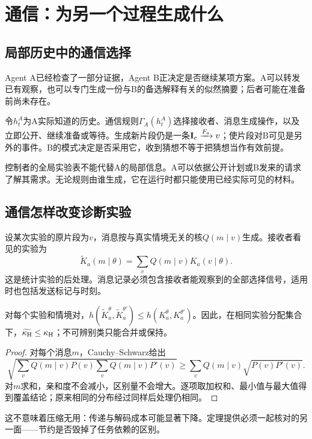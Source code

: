 \chapter{通信：为另一个过程生成什么}
\label{ch:communication}

\section{局部历史中的通信选择}
Agent A已经检查了一部分证据，Agent B正决定是否继续某项方案。A可以转发已有观察，也可以专门生成一份与B的备选解释有关的似然摘要；后者可能在准备前尚未存在。

令$h_t^A$为A实际知道的历史。通信规则$\Gamma_A(h_t^A)$选择接收者、消息生成操作，以及立即公开、继续准备或等待。生成新片段仍是一条$\mathbf I_e\xrightarrow{F_a}v$；使片段对B可见是另外的事件。B的模式决定是否采用它，收到猜想不等于把猜想当作有效前提。

控制者的全局实验表不能代替A的局部信息。A可以依据公开计划或B发来的请求了解其需求。无论规则由谁生成，它在运行时都只能使用已经实际可见的材料。

\section{通信怎样改变诊断实验}
设某次实验的原片段为$v$，消息按与真实情境无关的核$Q(m\mid v)$生成。接收者看见的实验为
\[
 \widetilde K_a(m\mid\theta)=\sum_vQ(m\mid v)K_a(v\mid\theta).
\]
这是统计实验的后处理\citep{blackwell1953}。消息记录必须包含接收者能观察到的全部选择信号，适用时也包括发送标记与时刻。

\begin{theorem}[通信压缩的覆盖单调性]
\label{thm:garbling}
对每个实验和情境对，$h(\widetilde K_a^\theta,\widetilde K_a^{\theta'})\le h(K_a^\theta,K_a^{\theta'})$。因此，在相同实验分配集合下，$\widetilde{\kappa_{\mathrm H}}\le\kappa_{\mathrm H}$；不可辨别类只能合并或保持。
\end{theorem}
\begin{proof}
对每个消息$m$，Cauchy--Schwarz给出
\[
 \sqrt{\sum_vQ(m\mid v)P(v)\sum_vQ(m\mid v)P'(v)}
 \ge\sum_vQ(m\mid v)\sqrt{P(v)P'(v)}.
\]
对$m$求和，亲和度不会减小，区别量不会增大。逐项取加权和、最小值与最大值得到覆盖结论；原来相同的分布经过同样后处理仍相同。
\end{proof}

这不意味着压缩无用：传递与解码成本可能显著下降。定理提供必须一起核对的另一面——节约是否毁掉了任务依赖的区别。

